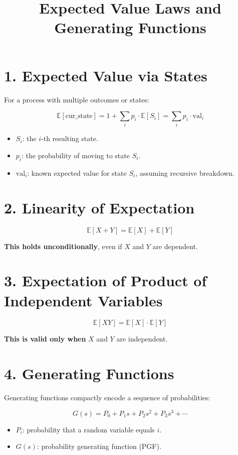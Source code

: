 \documentclass[12pt]{article}
\title{Expected Value Laws and Generating Functions}
\author{}
\date{}
\begin{document}
\maketitle

\section*{1. Expected Value via States}

For a process with multiple outcomes or states:

\[
\mathbb{E}[\text{cur\_state}] = 1 + \sum_i p_i \cdot \mathbb{E}[S_i] = \sum_i p_i \cdot \text{val}_i
\]

\begin{itemize}
  \item \( S_i \): the $i$-th resulting state.
  \item \( p_i \): the probability of moving to state \( S_i \).
  \item \( \text{val}_i \): known expected value for state \( S_i \), assuming recursive breakdown.
\end{itemize}

\section*{2. Linearity of Expectation}

\[
\mathbb{E}[X + Y] = \mathbb{E}[X] + \mathbb{E}[Y]
\]

\textbf{This holds unconditionally}, even if \( X \) and \( Y \) are dependent.

\section*{3. Expectation of Product of Independent Variables}

\[
\mathbb{E}[XY] = \mathbb{E}[X] \cdot \mathbb{E}[Y]
\]

\textbf{This is valid only when} \( X \) and \( Y \) are independent.

\section*{4. Generating Functions}

Generating functions compactly encode a sequence of probabilities:

\[
G(s) = P_0 + P_1 s + P_2 s^2 + P_3 s^3 + \cdots
\]

\begin{itemize}
  \item \( P_i \): probability that a random variable equals \( i \).
  \item \( G(s) \): probability generating function (PGF).
\end{itemize}
\end{document}
